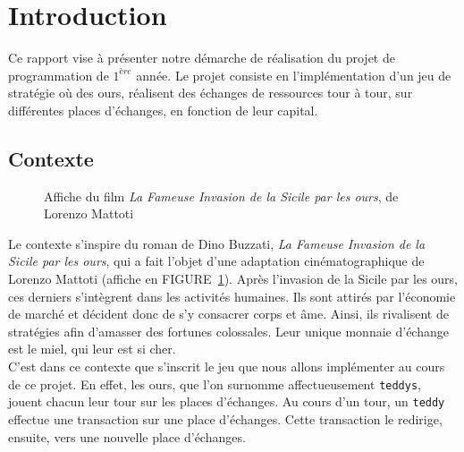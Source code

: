 \documentclass[12pt]{article}
\begin{document}
\onecolumn
{}
\section{Introduction}
Ce rapport vise à présenter notre démarche de réalisation du projet de programmation de $1^{ère}$ année. Le projet consiste en l'implémentation d'un jeu de stratégie où des ours, réalisent des échanges de ressources tour à tour, sur différentes places d'échanges, en fonction de leur capital.
\subsection{Contexte}
\begin{figure}[!h]
		    \centering
		    \caption{Affiche du film \textit{La Fameuse Invasion de la Sicile par les ours}, de Lorenzo Mattoti}
                    \label{Fig1}
	\end{figure}
Le contexte s'inspire du roman de Dino Buzzati, \textit{La Fameuse Invasion de la Sicile par les ours}, qui a fait l'objet d'une adaptation cinématographique de Lorenzo Mattoti (affiche en FIGURE~\ref{Fig1}). Après l'invasion de la Sicile par les ours, ces derniers s'intègrent dans les activités humaines. Ils sont attirés par l'économie de marché et décident donc de s'y consacrer corps et âme. Ainsi, ils rivalisent de stratégies afin d'amasser des fortunes colossales. Leur unique monnaie d'échange est le miel, qui leur est si cher. \\

        C'est dans ce contexte que s'inscrit le jeu que nous allons implémenter au cours de ce projet. En effet, les ours, que l'on surnomme affectueusement \texttt{teddys}, jouent chacun leur tour sur les places d'échanges. Au cours d'un tour, un \texttt{teddy} effectue une transaction sur une place d'échanges. Cette transaction le redirige, ensuite, vers une nouvelle place d'échanges.
\end{document}
